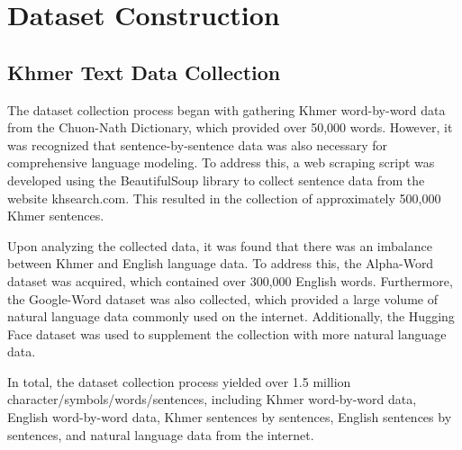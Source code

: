 
\chapter{Dataset Construction}
\label{ch:dataset}
\section{Khmer Text Data Collection}
\label{sec:text-source}

The dataset collection process began with gathering Khmer word-by-word data from the 
Chuon-Nath Dictionary, which provided over 50,000 words. However, it was recognized 
that sentence-by-sentence data was also necessary for comprehensive language modeling. 
To address this, a web scraping script was developed using the BeautifulSoup library 
to collect sentence data from the website khsearch.com. This resulted in the collection 
of approximately 500,000 Khmer sentences.

Upon analyzing the collected data, it was found that there was an imbalance between 
Khmer and English language data. To address this, the Alpha-Word dataset was acquired,
which contained over 300,000 English words. Furthermore, the Google-Word dataset 
was also collected, which provided a large volume of natural language data commonly 
used on the internet. Additionally, the Hugging Face dataset was used to supplement 
the collection with more natural language data.

In total, the dataset collection process yielded over 1.5 million 
character/symbols/words/sentences, including Khmer word-by-word data, 
English word-by-word data, Khmer sentences by sentences, English 
sentences by sentences, and natural language data from the internet.


